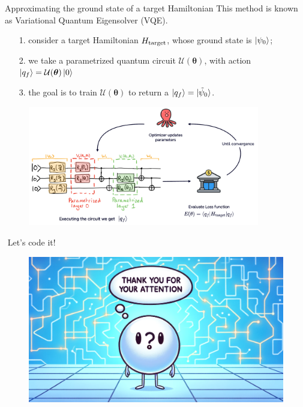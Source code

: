 \documentclass[8pt, xcolor={svgnames}, hyperref={linkcolor=amethyst}]{beamer}
\begin{document}
\begin{frame}{Approximating the ground state of a target Hamiltonian}
This method is known as Variational Quantum Eigensolver (VQE).
\pause
\begin{itemize}[noitemsep]
\item[1.] consider a target Hamiltonian $H_{\rm target}$, whose ground state is $\ket{\psi_0}$;
\pause
\item[2.] we take a parametrized quantum circuit $\mathcal{U}(\bm{\theta})$, with action $ \ket{q_f} = \mathcal{U}(\bm{\theta})\ket{0} $
\pause
\item[3.] the goal is to train $\mathcal{U}(\bm{\theta})$ to return a $\ket{q_f} = \ket{\tilde{\psi}_0}$.
\pause
\end{itemize}
\begin{figure}
    \includegraphics[width=0.9\textwidth]{figures/vqe.pdf}
\end{figure}
\pause
\begin{center}
\faTerminal\,\,Let's code it!
\end{center}
\end{frame}

\begin{frame}
\begin{figure}
    \includegraphics[width=1\textwidth]{figures/thank.png}%
\end{figure}
\end{frame}
\end{document}
